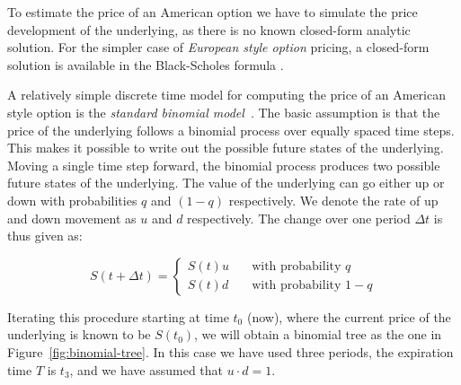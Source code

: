 \documentclass[preprint]{sigplanconf}
\begin{document}
To estimate the price of an American option we have to simulate the
price development of the underlying, as there is no known closed-form
analytic solution. For the simpler case of \emph{European style
  option} pricing, a closed-form solution is available in the
Black-Scholes formula \cite{black1973pricing}.

A relatively simple discrete time model for computing the price of an
American style option is the \emph{standard binomial
  model}~\cite{cox1979option}.  The basic assumption is that the price
of the underlying follows a binomial process over equally spaced time
steps. This makes it possible to write out the possible future states
of the underlying. Moving a single time step forward, the binomial
process produces two possible future states of the underlying. The
value of the underlying can go either up or down with probabilities
$q$ and $(1 - q)$ respectively. We denote the rate of up and down
movement as $u$ and $d$ respectively. The change over one period
$\Delta t$ is thus given as:

\begin{equation}
S(t+\Delta t) = \left\{
  \begin{array}{ll}
    S(t)u & \quad \textrm{with probability $q$} \\
    S(t)d & \quad \textrm{with probability $1-q$}
  \end{array} \right.
\end{equation}

Iterating this procedure starting at time $t_0$ (now), where the
current price of the underlying is known to be $S(t_0)$, we will
obtain a binomial tree as the one in
Figure~\ref{fig:binomial-tree}. In this case we have used three
periods, the expiration time $T$ is $t_3$, and we have assumed that
$u\cdot d = 1$.
\end{document}
